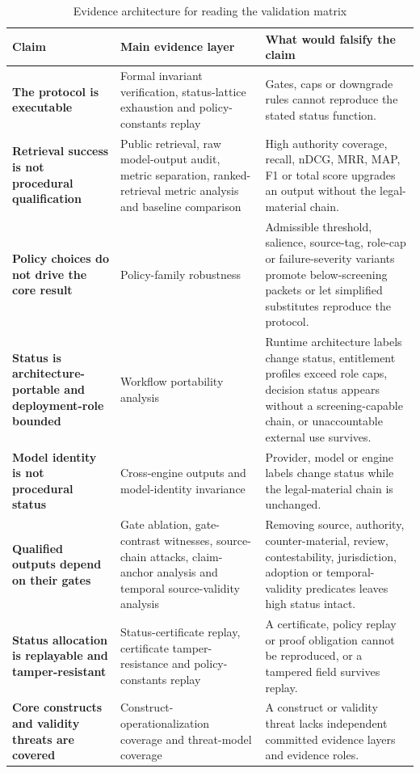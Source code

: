 \documentclass[12pt,a4paper]{article}
\begin{document}
\begin{table}[htbp]
\centering
\caption{Evidence architecture for reading the validation matrix}
\label{tab:evidence-architecture}
\small
\renewcommand{\arraystretch}{1.08}
\begin{tabularx}{\textwidth}{>{\bfseries}p{3.2cm}YY}
\toprule
Claim & Main evidence layer & What would falsify the claim \\
\midrule
The protocol is executable & Formal invariant verification, status-lattice exhaustion and policy-constants replay & Gates, caps or downgrade rules cannot reproduce the stated status function. \\
Retrieval success is not procedural qualification & Public retrieval, raw model-output audit, metric separation, ranked-retrieval metric analysis and baseline comparison & High authority coverage, recall, nDCG, MRR, MAP, F1 or total score upgrades an output without the legal-material chain. \\
Policy choices do not drive the core result & Policy-family robustness & Admissible threshold, salience, source-tag, role-cap or failure-severity variants promote below-screening packets or let simplified substitutes reproduce the protocol. \\
Status is architecture-portable and deployment-role bounded & Workflow portability analysis & Runtime architecture labels change status, entitlement profiles exceed role caps, decision status appears without a screening-capable chain, or unaccountable external use survives. \\
Model identity is not procedural status & Cross-engine outputs and model-identity invariance & Provider, model or engine labels change status while the legal-material chain is unchanged. \\
Qualified outputs depend on their gates & Gate ablation, gate-contrast witnesses, source-chain attacks, claim-anchor analysis and temporal source-validity analysis & Removing source, authority, counter-material, review, contestability, jurisdiction, adoption or temporal-validity predicates leaves high status intact. \\
Status allocation is replayable and tamper-resistant & Status-certificate replay, certificate tamper-resistance and policy-constants replay & A certificate, policy replay or proof obligation cannot be reproduced, or a tampered field survives replay. \\
Core constructs and validity threats are covered & Construct-operationalization coverage and threat-model coverage & A construct or validity threat lacks independent committed evidence layers and evidence roles. \\
\bottomrule
\end{tabularx}
\end{table}
\end{document}
